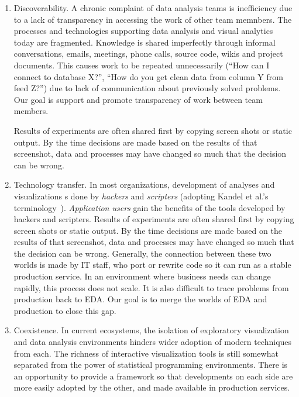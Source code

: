 \begin{enumerate}
\item Discoverability. A chronic complaint of data analysis teams is
inefficiency due to a lack of transparency in accessing the work of
other team memnbers.  The processes and technologies supporting
data analysis and visual analytics today are fragmented.
Knowledge is shared imperfectly through informal conversations, emails,
meetings, phone calls, source code, wikis and project documents.
This causes work to be repeated unnecessarily
(``How can I connect to database X?'', ``How do you get clean data
from column Y from feed Z?'') due to lack of communication about
previously solved problems. 
Our goal is support and
promote transparency of work between team members.

Results of experiments are often shared first by copying screen
shots or static output. By the time decisions are made based on
the results of that screenshot, data and processes may have changed
so much that the decision can be wrong.

\item Technology transfer.
In most organizations, development of analyses and visualizations 
s done by \emph{hackers} and \emph{scripters} (adopting Kandel et al.'s
terminology~\cite{Kandel:2012:EDA}). \emph{Application users} 
gain the benefits of the tools developed by hackers and scripters.
Results of experiments are often shared first by copying screen
shots or static output.  By the time decisions are made based on
the results of that screenshot, data and processes may have changed
so much that the decision can be wrong.
Generally, the connection between these two worlds is made by IT staff,
who port or rewrite code so it can run as a stable production service.
In an environment where business needs can change rapidly, this
process does not scale. It is also difficult to trace problems
from production back to EDA.
Our goal is to merge the worlds of EDA and production to close this gap.

\item Coexistence. In current ecosystems, the isolation of exploratory
visualization and data analysis environments hinders wider adoption of
modern techniques from each.
The richness of interactive visualization tools is still somewhat
separated from the power of statistical programming environments.
There is an opportunity to provide a framework so that developments
on each side are more easily adopted by the other, and made available
in production services.

\end{enumerate}

